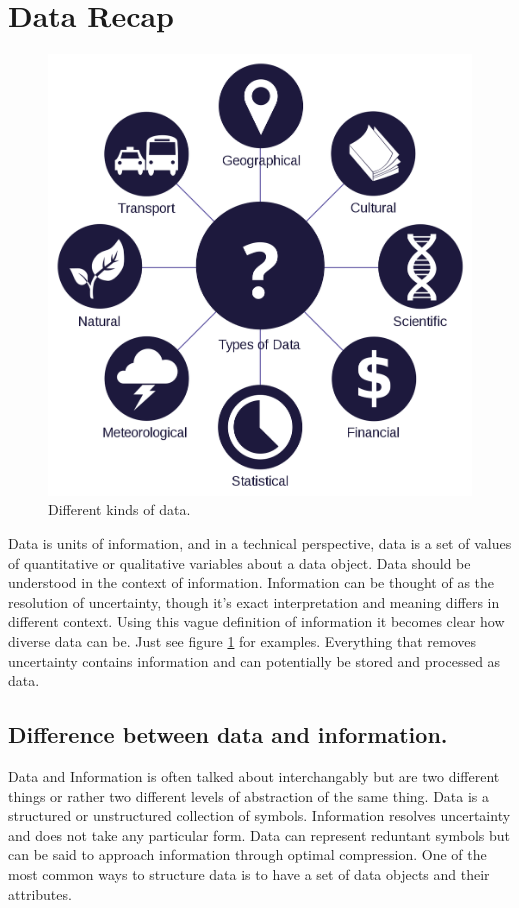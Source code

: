 \section{Data Recap}

\begin{figure}
    \centering
    \includegraphics[width=0.5\linewidth]{figures/datatypespng.png}
    \caption{Different kinds of data.}
    \label{fig:datatypes}
\end{figure}

Data is units of information, and in a technical perspective, data is a set
of values of quantitative or qualitative variables about a data object. 
Data should be understood in the context of information. Information can be 
thought of as the resolution of uncertainty, though it's 
exact interpretation and meaning differs in different context. Using this
vague definition of information it becomes clear how diverse data can be.
Just see figure \ref{fig:datatypes} for examples. 
Everything that removes uncertainty contains information and can potentially 
be stored and processed as data.

\subsection{Difference between data and information.}
Data and Information is often talked about interchangably but are two different
things or rather two different levels of abstraction of the same thing. Data is 
a structured or unstructured collection of symbols. Information resolves 
uncertainty and does not take any particular form. Data can represent reduntant
symbols but can be said to approach information through optimal compression. 
One of the most common ways to structure data is to have a set of data objects
and their attributes.

